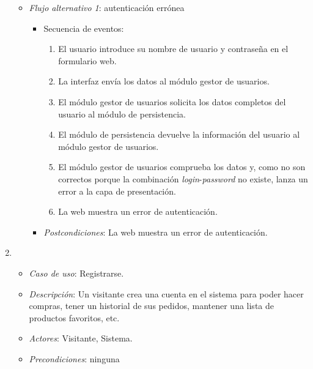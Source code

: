 \begin{enumerate}[{\bf UC-1}]
\begin{itemize}
  \item {\it Flujo alternativo 1}: autenticación errónea
  \begin{itemize}
    \item Secuencia de eventos:
      
  
    \begin{enumerate}[1. ]
    \item El usuario introduce su nombre de usuario y contraseña en el formulario web.
    \item La interfaz envía los datos al módulo gestor de usuarios.
    \item El módulo gestor de usuarios solicita los datos completos del usuario al módulo de persistencia.
    \item El módulo de persistencia devuelve la información del usuario al módulo gestor de usuarios.
    \item El módulo gestor de usuarios comprueba los datos y, como no son correctos porque la combinación \textit{login}-\textit{password} no existe, lanza un error a la capa de presentación.
    \item La web muestra un error de autenticación.
    \end{enumerate}
  \item {\it Postcondiciones}: La web muestra un error de autenticación. 
\end{itemize}


  \end{itemize}

\item 
  \begin{itemize}
  \item {\it Caso de uso}: Registrarse.
  \item {\it Descripción}: Un visitante crea una cuenta en el sistema para poder hacer compras, tener un historial de sus pedidos, mantener una lista de productos favoritos, etc.
  \item {\it Actores}: Visitante, Sistema.
  \item {\it Precondiciones}: ninguna



\end{itemize}
\end{enumerate}
